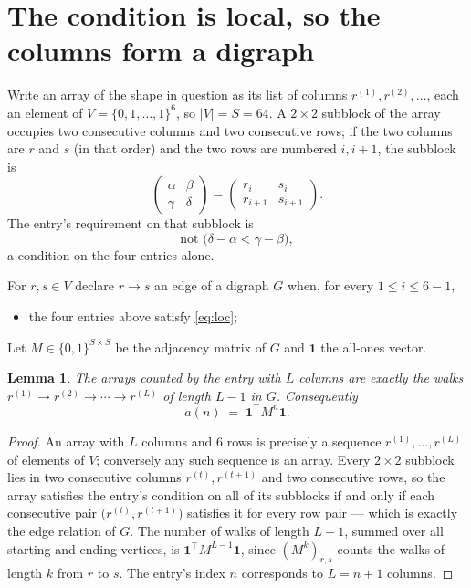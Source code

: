 \documentclass[11pt,a4paper]{article}
\theoremstyle{plain}
\newtheorem{lemma}[theorem]{Lemma}
\theoremstyle{definition}
\begin{document}
\section{The condition is local, so the columns form a digraph}

Write an array of the shape in question as its list of columns
$r^{(1)},r^{(2)},\dots$, each an element of
$V=\{0,1,\dots,1\}^{6}$, so $|V|=S=64$. A $2\times2$ subblock of the array
occupies two consecutive columns and two consecutive rows; if the two columns are $r$
and $s$ (in that order) and the two rows are numbered $i,i+1$,
the subblock is
\[
\begin{pmatrix}\alpha&\beta\\\gamma&\delta\end{pmatrix}=\begin{pmatrix}r_i&s_i\\r_{i+1}&s_{i+1}\end{pmatrix}.
\]
The entry's requirement on that subblock is
\begin{equation}\label{eq:loc}
\text{not }\bigl(\delta-\alpha<\gamma-\beta\bigr),
\end{equation}
a condition on the four entries alone.

For $r,s\in V$ declare $r\to s$ an edge of a digraph $G$ when, for every
$1\le i\le 6-1$,
\begin{itemize}
\item the four entries above satisfy \eqref{eq:loc};

\end{itemize}
Let $M\in\{0,1\}^{S\times S}$ be the adjacency matrix of $G$ and $\mathbf{1}$ the
all-ones vector.

\begin{lemma}\label{lem:walk}
The arrays counted by the entry with $L$ columns are exactly the walks
$r^{(1)}\to r^{(2)}\to\cdots\to r^{(L)}$ of length $L-1$ in $G$. Consequently
\[
a(n)\;=\;\mathbf{1}^{\!\top}M^{n}\mathbf{1} .
\]
\end{lemma}

\begin{proof}
An array with $L$ columns and $6$ rows is precisely a sequence
$r^{(1)},\dots,r^{(L)}$ of elements of $V$; conversely any such sequence is an array.
Every $2\times2$ subblock lies in two consecutive columns $r^{(t)},r^{(t+1)}$ and two
consecutive rows, so the array satisfies the entry's condition on all of its subblocks
if and only if each consecutive pair $\bigl(r^{(t)},r^{(t+1)}\bigr)$ satisfies it for
every row pair --- which is exactly the edge relation of $G$. The number of walks of
length $L-1$, summed over all starting and ending vertices, is
$\mathbf{1}^{\!\top}M^{L-1}\mathbf{1}$, since $(M^{k})_{r,s}$ counts the walks of
length $k$ from $r$ to $s$. The entry's index $n$ corresponds to $L=n+1$ columns.
\end{proof}
\end{document}
